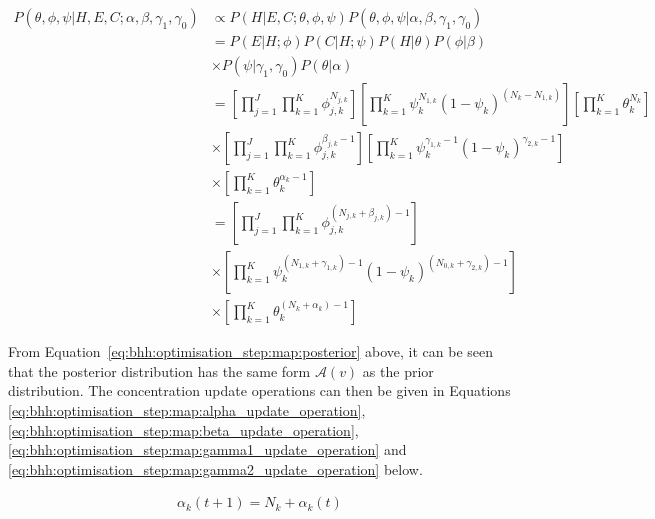 \begin{equation}
      \label{eq:bhh:optimisation_step:map:posterior}
      \begin{split}
            P(\theta, \phi, \psi \vert H, E, C;  \alpha, \beta, \gamma_{1}, \gamma_{0})
            &\propto P(H \vert E, C; \theta, \phi, \psi)P(\theta, \phi, \psi \vert \alpha, \beta, \gamma_{1}, \gamma_{0}) \\
            &= P(E \vert H; \phi) P(C \vert H; \psi) P(H \vert \theta) P(\phi \vert \beta) \\
            &\times P(\psi \vert \gamma_{1}, \gamma_{0}) P(\theta \vert \alpha)  \\
            &= \left[ \prod_{j=1}^{J} \prod_{k=1}^{K} \phi_{j,k}^{N_{j,k}} \right] \left[ \prod_{k=1}^{K} \psi_{k}^{N_{1,k}} (1 - \psi_{k})^{(N_{k} - N_{1,k})} \right] \left[ \prod_{k=1}^{K} \theta_{k}^{N_{k}} \right] \\
            &\times \left[ \prod_{j=1}^{J} \prod_{k=1}^{K} \phi_{j,k}^{\beta_{j,k} - 1} \right] \left[ \prod_{k=1}^{K} \psi_{k}^{\gamma_{1,k} - 1} (1 - \psi_{k})^{\gamma_{2,k} - 1} \right] \\
            &\times \left[ \prod_{k=1}^{K} \theta_{k}^{\alpha_{k} - 1} \right] \\
            &= \left[ \prod_{j=1}^{J} \prod_{k=1}^{K} \phi_{j,k}^{(N_{j,k} + \beta_{j,k}) - 1} \right] \\
            &\times \left[ \prod_{k=1}^{K} \psi_{k}^{(N_{1,k} + \gamma_{1,k}) - 1} (1 - \psi_{k})^{(N_{0,k} + \gamma_{2,k} )- 1} \right] \\
            &\times \left[ \prod_{k=1}^{K} \theta_{k}^{(N_{k} + \alpha_{k}) - 1} \right]
      \end{split}
\end{equation}

From Equation~\eqref{eq:bhh:optimisation_step:map:posterior} above, it can be seen that the posterior distribution has the same form $\mathcal{A}(v)$ as the prior distribution. The concentration update operations can then be given in Equations \eqref{eq:bhh:optimisation_step:map:alpha_update_operation}, \eqref{eq:bhh:optimisation_step:map:beta_update_operation}, \eqref{eq:bhh:optimisation_step:map:gamma1_update_operation} and \eqref{eq:bhh:optimisation_step:map:gamma2_update_operation} below.

\begin{equation}
      \label{eq:bhh:optimisation_step:map:alpha_update_operation}
      \begin{split}
            \alpha_{k}(t+1) = N_{k} + \alpha_{k}(t)
      \end{split}
\end{equation}

